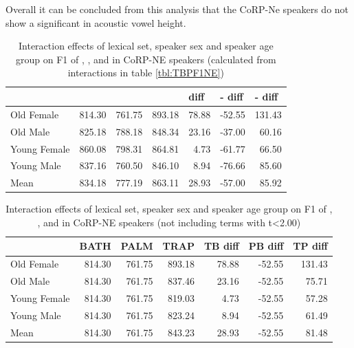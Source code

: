 \documentclass[../../../00.FullDoc/tex/APRReport-year4]{subfiles}
\begin{document}
Overall it can be concluded from this analysis that the CoRP-Ne speakers do not show a significant \TB{} in acoustic vowel height.



\begin{table}[htbp]
	\centering
	\begin{tabular}{lrrrrrr}
		\hline
		& \multicolumn{1}{l}{\bath{}} & \multicolumn{1}{l}{\palm{}} & \multicolumn{1}{l}{\trap{}} & \multicolumn{1}{l}{\TB{} diff} & \multicolumn{1}{l}{\palm{}-\bath{} diff} & \multicolumn{1}{l}{\trap{}-\palm{} diff} \\
		\hline
		Old Female & 814.30 & 761.75 & 893.18 & 78.88 & -52.55 & 131.43 \\
		Old Male & 825.18 & 788.18 & 848.34 & 23.16 & -37.00 & 60.16 \\
		Young Female & 860.08 & 798.31 & 864.81 & 4.73  & -61.77 & 66.50 \\
		Young Male & 837.16 & 760.50 & 846.10 & 8.94  & -76.66 & 85.60 \\
		Mean  & 834.18 & 777.19 & 863.11 & 28.93 & -57.00 & 85.92 \\
		\hline
	\end{tabular}%
	\caption{Interaction effects of lexical set, speaker sex and speaker age group on F1 of \trap{}, \bath{}, and \palm{} in CoRP-NE speakers (calculated from interactions in table \ref{tbl:TBPF1NE})} \label{TBPF1NE-inter}%
\end{table}%

\begin{table}[htbp]
	\centering
	\begin{tabular}{lrrrrrr}
		& \multicolumn{1}{l}{BATH} & \multicolumn{1}{l}{PALM} & \multicolumn{1}{l}{TRAP} & \multicolumn{1}{l}{TB diff} & \multicolumn{1}{l}{PB diff} & \multicolumn{1}{l}{TP diff} \\
		\hline
		Old Female & 814.30 & 761.75 & 893.18 & 78.88 & -52.55 & 131.43 \\
		Old Male & 814.30 & 761.75 & 837.46 & 23.16 & -52.55 & 75.71 \\
		Young Female & 814.30 & 761.75 & 819.03 & 4.73  & -52.55 & 57.28 \\
		Young Male & 814.30 & 761.75 & 823.24 & 8.94  & -52.55 & 61.49 \\
		\hline
		Mean  & 814.30 & 761.75 & 843.23 & 28.93 & -52.55 & 81.48 \\
	\end{tabular}%
	\caption{Interaction effects of lexical set, speaker sex and speaker age group on F1 of \trap{}, \bath{}, and \palm{} in CoRP-NE speakers (not including terms with t<2.00)} \label{TBPF1NE-inter2}%
\end{table}%
\end{document}
